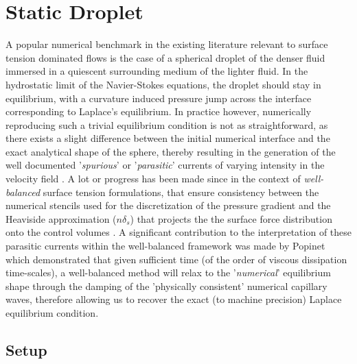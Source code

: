 \section{Static Droplet}

A popular numerical benchmark in the existing literature relevant to surface tension dominated flows is the case of a spherical droplet of the denser fluid immersed in a quiescent surrounding medium of the lighter fluid. In the hydrostatic limit of the Navier-Stokes equations, the droplet should stay in equilibrium, with a curvature induced pressure jump across the interface corresponding to Laplace's equilibrium. In practice however, numerically reproducing such a trivial equilibrium condition is not as straightforward, as there exists a slight difference between the initial numerical interface and the exact analytical shape of the sphere, thereby resulting in the generation of the well documented '\textit{spurious}' or '\textit{parasitic}' currents of varying intensity in the velocity field . A lot or progress has been made since in the context of \textit{well-balanced} surface tension formulations, that ensure consistency between the numerical stencils used for the discretization of the pressure gradient and the Heaviside approximation ($n \delta_{s}$) that projects the the surface force distribution onto the control volumes \cite{francois2006balanced,popinet2009accurate}. A significant contribution to the interpretation of these parasitic currents within the well-balanced framework was made by Popinet \cite{popinet2009accurate} which demonstrated that given sufficient time (of the order of viscous dissipation time-scales), a well-balanced method will relax to the '\textit{numerical}' equilibrium shape through the damping of the 'physically consistent' numerical capillary waves, therefore allowing us to recover the exact (to machine precision) Laplace equilibrium condition.

\subsection*{Setup}


